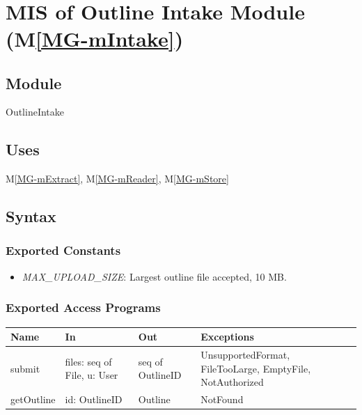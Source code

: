 \documentclass[12pt, titlepage]{article}
\newcommand{\mref}[1]{M\ref{MG-#1}}
\begin{document}
\newpage
~\newpage

\section{MIS of Outline Intake Module (\mref{mIntake})} \label{mis-mIntake}

\subsection{Module}

OutlineIntake

\subsection{Uses}

\mref{mExtract}, \mref{mReader}, \mref{mStore}

\subsection{Syntax}

\subsubsection{Exported Constants}

\begin{itemize}
\item \textit{MAX\_UPLOAD\_SIZE}: Largest outline file accepted, 10 MB.
\end{itemize}

\subsubsection{Exported Access Programs}

\begin{center}\small
\begin{tabular}{>{\raggedright\arraybackslash}p{3.3cm} >{\raggedright\arraybackslash}p{4.1cm} >{\raggedright\arraybackslash}p{3.4cm} >{\raggedright\arraybackslash}p{4.0cm}}
\hline
\textbf{Name} & \textbf{In} & \textbf{Out} & \textbf{Exceptions} \\
\hline
submit & files: seq of File, u: User & seq of OutlineID & UnsupportedFormat, FileTooLarge, EmptyFile, NotAuthorized \\
getOutline & id: OutlineID & Outline & NotFound \\
\hline
\end{tabular}
\end{center}
\end{document}
